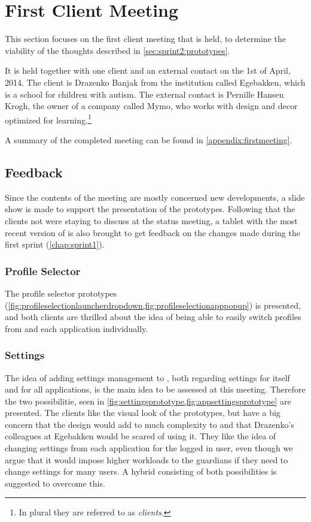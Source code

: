 \section{First Client Meeting}\label{sec:sprint2:firstmeeting}
This section focuses on the first client meeting that is held, to determine the viability of the thoughts described in \cref{sec:sprint2:prototypes}.

It is held together with one client and an external contact on the 1st of April, 2014.
The client is Drazenko Banjak from the institution called Egebakken, which is a school for children with autism.
The external contact is Pernille Hansen Krogh, the owner of a company called Mymo, who works with design and decor optimized for learning.\footnote{In plural they are referred to as \textit{clients}.}

A summary of the completed meeting can be found in \cref{appendix:firstmeeting}.

\subsection{Feedback}\label{sec:firstmeeting:feedback}
Since the contents of the meeting are mostly concerned new developments, a slide show is made to support the presentation of the prototypes.
Following that the clients not were staying to discuss \giraf at the status meeting, a tablet with the most recent version of \launcher is also brought to get feedback on the changes made during the first sprint (\cref{chap:sprint1}).


\subsubsection{Profile Selector}
The profile selector prototypes (\cref{fig:profileselectionlauncherdropdown,fig:profileselectionapppopup}) is presented, and both clients are thrilled about the idea of being able to easily switch profiles from \launcher and each \giraf application individually.

\subsubsection{Settings}
The idea of adding settings management to \launcher, both regarding settings for \launcher itself and for all \giraf applications, is the main idea to be assessed at this meeting.
Therefore the two possibilitie, seen in \cref{fig:settingsprototype,fig:appsettingsprototype} are presented.
The clients like the visual look of the prototypes, but have a big concern that the design would add to much complexity to \launcher and that Drazenko's colleagues at Egebakken would be scared of using it.
They like the idea of changing settings from each application for the logged in user, even though we argue that it would impose higher workloads to the guardians if they need to change settings for many users.
A hybrid consisting of both possibilities is suggested to overcome this.

